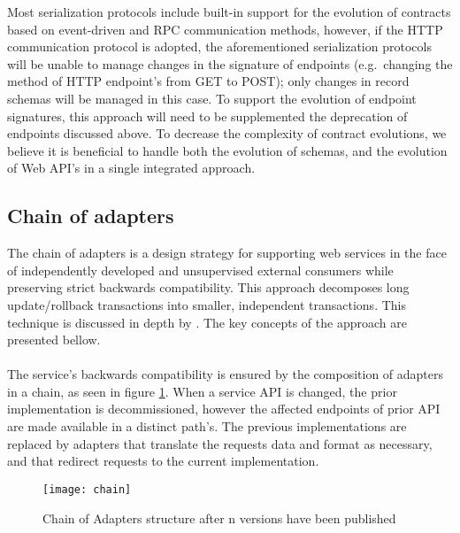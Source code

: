 Most serialization protocols include built-in support for the evolution of contracts based on event-driven and RPC communication methods,
however, if the HTTP communication protocol is adopted, the aforementioned serialization protocols will be unable to manage changes in the signature of endpoints
(e.g.\ changing the method of HTTP endpoint's from GET to POST); only changes in record schemas will be managed in this case.
To support the evolution of endpoint signatures, this approach will need to be supplemented the deprecation of endpoints discussed above.
To decrease the complexity of contract evolutions, we believe it is beneficial to handle both the evolution of schemas, and the evolution of Web API's in a single integrated approach.

\subsection{Chain of adapters} %
\label{sec:chain_of_adapters}

The chain of adapters is a design strategy for supporting web services in the face of independently developed and unsupervised external consumers while preserving strict backwards compatibility.
This approach decomposes long update/rollback transactions into smaller, independent transactions.
This technique is discussed in depth by \citeauthor{13} \cite{13}.
The key concepts of the approach are presented bellow.

\paragraph{}

The service's backwards compatibility is ensured by the composition of adapters in a chain, as seen in figure \ref{fig:chain}.
When a service API is changed, the prior implementation is decommissioned, however the affected endpoints of prior API are made available in a distinct path's.
The previous implementations are replaced by adapters that translate the requests data and format as necessary, and that redirect requests to the current implementation.

\begin{figure}[htbp]
    \centering
    \texttt{[image: chain]}
    \caption{Chain of Adapters structure
    after n versions have been published }
    \label{fig:chain}
\end{figure}

\paragraph{}

